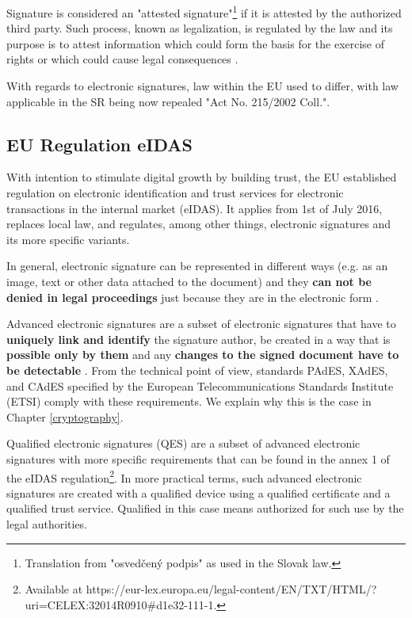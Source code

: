 \documentclass[thesismargins, english, thesislinespacing, twoside, openright, upjsfrontpage]{rnthesis}
\begin{document}
Signature is considered an "attested signature"\footnote{Translation from "osvedčený podpis" as used in the Slovak law.} if it is attested by the authorized third party.
Such process, known as legalization, is regulated by the law and its purpose is to attest information which could form the basis for the exercise of rights or which could cause legal consequences \cite{notarylaw}.

With regards to electronic signatures, law within the EU used to differ, with law applicable in the SR being now repealed "Act No. 215/2002 Coll.".

\subsection{EU Regulation eIDAS} \label{eidas}

With intention to stimulate digital growth by building trust, the EU established regulation on electronic identification and trust services for electronic transactions in the internal market (eIDAS).
It applies from 1st of July 2016, replaces local law, and regulates, among other things, electronic signatures and its more specific variants.


In general, electronic signature can be represented in different ways (e.g. as an image, text or other data attached to the document) and they \textbf{can not be denied in legal proceedings} just because they are in the electronic form \cite{eidas}.

Advanced electronic signatures are a subset of electronic signatures that have to \textbf{uniquely link and identify} the signature author, be created in a way that is \textbf{possible only by them} and any \textbf{changes to the signed document have to be detectable} \cite{eidas}.
From the technical point of view, standards PAdES, XAdES, and CAdES specified by the European Telecommunications Standards Institute (ETSI) comply with these requirements. We explain why this is the case in Chapter \ref{cryptography}.

Qualified electronic signatures (QES) are a subset of advanced electronic signatures with more specific requirements that can be found in the annex 1 of the eIDAS regulation\footnote{Available at https://eur-lex.europa.eu/legal-content/EN/TXT/HTML/?uri=CELEX:32014R0910\#d1e32-111-1.}.
In more practical terms, such advanced electronic signatures are created with a qualified device using a qualified certificate and a qualified trust service. Qualified in this case means authorized for such use by the legal authorities.
\end{document}
